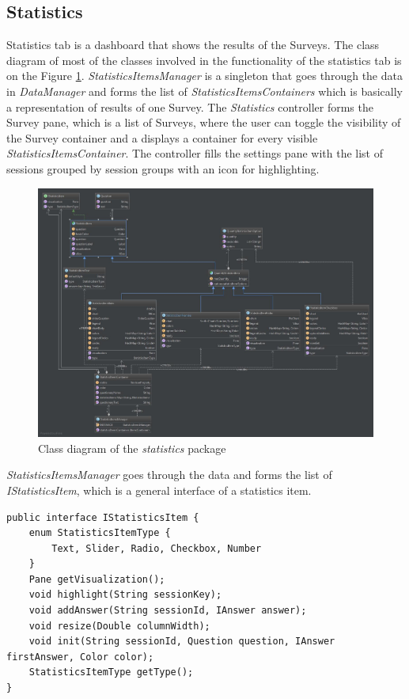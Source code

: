 \subsection{Statistics}
Statistics tab is a dashboard that shows the results of the Surveys. The class diagram of most of the classes involved in the functionality of the statistics tab is on the Figure \ref{fig:d2}. \textit{StatisticsItemsManager} is a singleton that goes through the data in \textit{DataManager} and forms the list of \textit{StatisticsItemsContainers} which is basically a representation of results of one Survey. The \textit{Statistics} controller forms the Survey pane, which is a list of Surveys, where the user can toggle the visibility of the Survey container and a displays a container for every visible \textit{StatisticsItemsContainer}. The controller fills the settings pane with the list of sessions grouped by session groups with an icon for highlighting.\\

\begin{figure}[htb]
 \centering
\includegraphics[width=\textwidth]{figures/diagram2.jpg}
\caption{Class diagram of the \textit{statistics} package}
\label{fig:d2}
\end{figure}

\textit{StatisticsItemsManager} goes through the data and forms the list of \textit{IStatisticsItem}, which is a general interface of a statistics item.\\


\lstset{language=Java} 
\begin{lstlisting}
public interface IStatisticsItem {
    enum StatisticsItemType {
        Text, Slider, Radio, Checkbox, Number
    }
    Pane getVisualization();
    void highlight(String sessionKey);
    void addAnswer(String sessionId, IAnswer answer);
    void resize(Double columnWidth);
    void init(String sessionId, Question question, IAnswer firstAnswer, Color color);
    StatisticsItemType getType();
}
\end{lstlisting}

